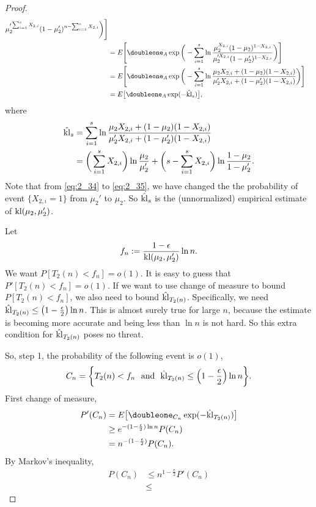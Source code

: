\begin{proof}
\begin{align}
                {\mu_2'^{\sum_{i=1}^s X_{2,i}}(1-\mu_2')^{n-\sum_{i=1}^s X_{2,i}}}\bigg)\Bigg] \\
            &= E\Bigg[\doubleone_A \exp\bigg(-\sum_{i=1}^s \ln
                \frac{\mu_2^{X_{2,i}}(1-\mu_2)^{1-X_{2,i}}}
                {\mu_2'^{X_{2,i}}(1-\mu_2')^{1-X_{2,i}}}\bigg)\Bigg] \\
            &= E\Bigg[\doubleone_A \exp\bigg(-\sum_{i=1}^s \ln
                \frac{\mu_2 X_{2,i} + (1-\mu_2) (1-X_{2,i})}
                {\mu_2' X_{2,i} + (1-\mu_2')(1-X_{2,i})}\bigg)\Bigg] \\
            &= E\big[\doubleone_A \exp(-\hat\kl_s)\big],
    \end{align}
    where
    \begin{align}
        \hat{{\mathop{\mathrm{kl}}}}_s
            &= \sum_{i=1}^s \ln
                \frac{\mu_2 X_{2,i} + (1-\mu_2) (1-X_{2,i})}
                {\mu_2' X_{2,i} + (1-\mu_2')(1-X_{2,i})} \\
            &= \bigg(\sum_{i=1}^s X_{2,i}\bigg)\ln\frac{\mu_2}{\mu_2'} +
                \bigg(s-\sum_{i=1}^s X_{2,i}\bigg)\ln\frac{1-\mu_2}{1-\mu_2'}.
    \end{align}
    Note that from \eqref{eq:2_34} to \eqref{eq:2_35},
    we have changed the the probability of event $\{X_{2,i}=1\}$ from $\mu_2'$ to $\mu_2$.
    So $\hat{{\mathop{\mathrm{kl}}}}_s$ is the (unnormalized) empirical estimate of ${\mathop{\mathrm{kl}}}(\mu_2,\mu_2')$.

    Let
    \begin{equation}
        f_n:=\frac{1-\epsilon}{{\mathop{\mathrm{kl}}}(\mu_2,\mu_2')}\ln n.
    \end{equation}
    We want $P[T_2(n)<f_n]=o(1)$.
    It is easy to guess that $P'[T_2(n)<f_n]=o(1)$.
    If we want to use change of measure to bound $P[T_2(n)<f_n]$,
    we also need to bound $\hat{{\mathop{\mathrm{kl}}}}_{T_2(n)}$.
    Specifically, we need $\hat{{\mathop{\mathrm{kl}}}}_{T_2(n)} \le \big(1-\frac{\epsilon}{2}\big)\ln n$.
    This is almost surely true for large $n$,
    because the estimate is becoming more accurate
    and being less than $\ln n$ is not hard.
    So this extra condition for $\hat{{\mathop{\mathrm{kl}}}}_{T_2(n)}$ poses no threat.

    So, step 1, the probability of the following event is $o(1)$,
    \begin{align}
        C_n=\bigg\{ T_2(n)<f_n
            ~~\text{and}~~
            \hat {{\mathop{\mathrm{kl}}}}_{T_2(n)} \le \Big(1-\frac{\epsilon}{2}\Big)\ln n \bigg\}.
    \end{align}
    First change of measure,
    \begin{align}
        P'(C_n)
            &= E\big[\doubleone_{C_n} \exp(-\hat\kl_{T_2(n)})\big] \\
            &\ge e^{-(1-\frac{\epsilon}{2})\ln n} P(C_n) \\
            &= n^{-(1-\frac{\epsilon}{2})} P(C_n).
    \end{align}
    By Markov's inequality,
    \begin{align}
        P(C_n)
            &\le n^{1-\frac{\epsilon}{2}} P'(C_n) \\
            &\le
    \end{align}

\end{proof}

